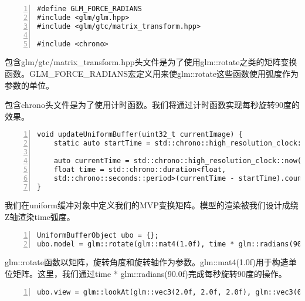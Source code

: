 \documentclass{ctexart}
\begin{document}
\begin{lstlisting}[language={[ANSI]C},keywordstyle=\color{blue!70},commentstyle=\color{red!50!green!50!blue!50},frame=shadowbox, rulesepcolor=\color{red!20!green!20!blue!20},basicstyle=\small,numbers=left, numberstyle=\tiny,breaklines=true]
#define GLM_FORCE_RADIANS
#include <glm/glm.hpp>
#include <glm/gtc/matrix_transform.hpp>

#include <chrono>
\end{lstlisting}

包含glm/gtc/matrix\_transform.hpp头文件是为了使用glm::rotate之类的矩阵变换函数。GLM\_FORCE\_RADIANS宏定义用来使glm::rotate这些函数使用弧度作为参数的单位。

包含chrono头文件是为了使用计时函数。我们将通过计时函数实现每秒旋转90度的效果。

\begin{lstlisting}[language={[ANSI]C},keywordstyle=\color{blue!70},commentstyle=\color{red!50!green!50!blue!50},frame=shadowbox, rulesepcolor=\color{red!20!green!20!blue!20},basicstyle=\small,numbers=left, numberstyle=\tiny,breaklines=true]
void updateUniformBuffer(uint32_t currentImage) {
	static auto startTime = std::chrono::high_resolution_clock::now();

	auto currentTime = std::chrono::high_resolution_clock::now();
	float time = std::chrono::duration<float,
	std::chrono::seconds::period>(currentTime - startTime).count();
}
\end{lstlisting}

我们在uniform缓冲对象中定义我们的MVP变换矩阵。模型的渲染被我们设计成绕Z轴渲染time弧度。

\begin{lstlisting}[language={[ANSI]C},keywordstyle=\color{blue!70},commentstyle=\color{red!50!green!50!blue!50},frame=shadowbox, rulesepcolor=\color{red!20!green!20!blue!20},basicstyle=\small,numbers=left, numberstyle=\tiny,breaklines=true]
UniformBufferObject ubo = {};
ubo.model = glm::rotate(glm::mat4(1.0f), time * glm::radians(90.0f), glm::vec3(0.0f, 0.0f, 1.0f));
\end{lstlisting}

glm::rotate函数以矩阵，旋转角度和旋转轴作为参数。glm::mat4(1.0f)用于构造单位矩阵。这里，我们通过time * glm::radians(90.0f)完成每秒旋转90度的操作。

\begin{lstlisting}[language={[ANSI]C},keywordstyle=\color{blue!70},commentstyle=\color{red!50!green!50!blue!50},frame=shadowbox, rulesepcolor=\color{red!20!green!20!blue!20},basicstyle=\small,numbers=left, numberstyle=\tiny,breaklines=true]
ubo.view = glm::lookAt(glm::vec3(2.0f, 2.0f, 2.0f), glm::vec3(0.0f, 0.0f, 0.0f), glm::vec3(0.0f, 0.0f, 1.0f));
\end{lstlisting}
\end{document}
